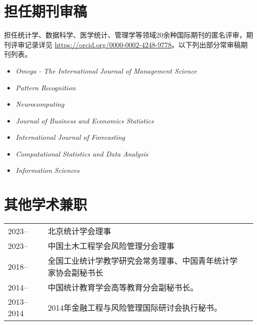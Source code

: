 \documentclass[twoside,a4paper,11pt]{article}
\begin{document}
\section*{担任期刊审稿}

担任统计学、数据科学、医学统计、管理学等领域20余种国际期刊的匿名评审，期刊评审记录详见 \url{https://orcid.org/0000-0002-4248-9778}。以下列出部分常审稿期刊列表。

\begin{itemize}
\item \emph{Omega - The International Journal of Management Science}
\item \emph{Pattern Recognition}
\item \emph{Neurocomputing}
\item  \emph{Journal of Business and Economics Statistics}
\item  \emph{International Journal of Forecasting}
\item  \emph{Computational Statistics and Data Analysis}
\item  \emph{Information Sciences}
\end{itemize}

\section*{其他学术兼职}
\begin{tabular}{l p{} l}
  2023--     & 北京统计学会理事                 \\
  2023--     & 中国土木工程学会风险管理分会理事 \\
  2018--     & 全国工业统计学教学研究会常务理事、中国青年统计学家协会副秘书长 \\
  2014--     & 中国统计教育学会高等教育分会副秘书长。                         \\
  2013--2014 & 2014年金融工程与风险管理国际研讨会执行秘书。                   \\

\end{tabular}
\end{document}
